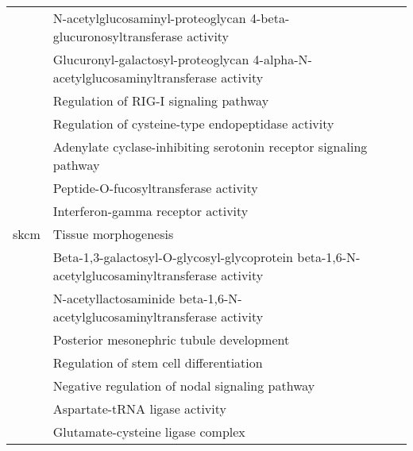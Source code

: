 \begin{appendices}
\begin{longtable}{lp{}}
                                 & N-acetylglucosaminyl-proteoglycan 4-beta-glucuronosyltransferase activity                       \\
                                 & Glucuronyl-galactosyl-proteoglycan 4-alpha-N-acetylglucosaminyltransferase activity             \\
                                 & Regulation of RIG-I signaling pathway                                                           \\
                                 & Regulation of cysteine-type endopeptidase activity                                              \\
                                 & Adenylate cyclase-inhibiting serotonin receptor signaling pathway                               \\
                                 & Peptide-O-fucosyltransferase activity                                                           \\
                                 & Interferon-gamma receptor activity                                                              \\
	\hline
	\gls{skcm}                   & Tissue morphogenesis                                                                            \\
                                 & Beta-1,3-galactosyl-O-glycosyl-glycoprotein beta-1,6-N-acetylglucosaminyltransferase activity   \\
                                 & N-acetyllactosaminide beta-1,6-N-acetylglucosaminyltransferase activity                         \\
                                 & Posterior mesonephric tubule development                                                        \\
                                 & Regulation of stem cell differentiation                                                         \\
                                 & Negative regulation of nodal signaling pathway                                                  \\
                                 & Aspartate-tRNA ligase activity                                                                  \\
                                 & Glutamate-cysteine ligase complex                                                               \\

\end{longtable}
\end{appendices}
